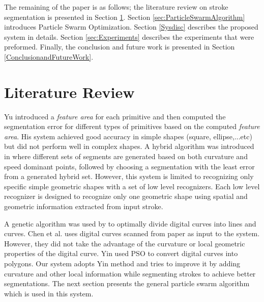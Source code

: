 \documentclass[preprint,10pt,5p,twocolumn]{elsarticle}
\begin{document}

 The remaining of the paper is as follows; the literature review on stroke segmentation is presented in Section \ref{sec:review}. Section \ref{sec:ParticleSwarmAlgorithm} introduces Particle Swarm Optimization. Section \ref{Sysdisc} describes the proposed system in details. Section \ref{sec:Experiments} describes the experiments that were preformed. Finally, the conclusion and future work is presented in Section \ref{ConclusionandFutureWork}.  

\section{Literature Review}
\label{sec:review}

Yu \cite{meanshift10} introduced a \textit{feature area} for each primitive and then computed the segmentation error for different types of primitives based on the computed \textit{feature area}. His system achieved good accuracy in simple shapes (square, ellipse,...etc) but did not perform well in complex shapes. A hybrid algorithm was introduced in \cite{earlyprocess} where different sets of segments are generated based on both curvature and speed dominant points, followed by choosing a segmentation with the least error from a generated hybrid set. However, this system is limited to recognizing only specific simple geometric shapes with a set of low level recognizers. Each low level recognizer is designed to recognize only one geometric shape using spatial and geometric information extracted from input stroke. 

A genetic algorithm was used by \cite{CruveDivisionSwarm} to optimally divide digital curves into lines and curves. Chen et al. \cite{CruveDivisionSwarm} uses digital curves scanned from paper as input to the system. However, they did not take the advantage of the curvature or local geometric properties of the digital curve. Yin \cite{PolygonApproximationPSO} used PSO to convert digital curves into polygons. Our system adopts  Yin \cite{PolygonApproximationPSO} method and tries to improve it by adding curvature and other local information while segmenting strokes to achieve better segmentations. The next section presents the general particle swarm algorithm which is used in this system.
\end{document}
